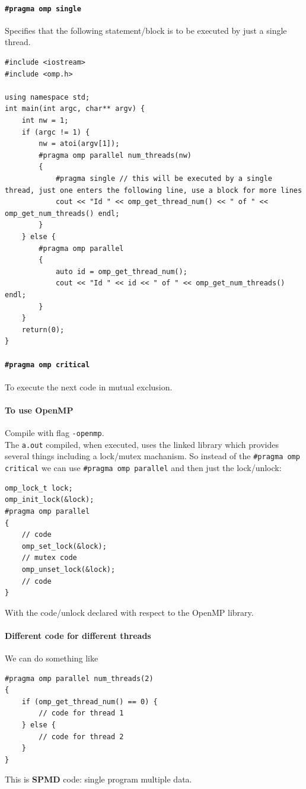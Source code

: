 \documentclass[10pt]{report}
\begin{document}
\paragraph{\texttt{\#pragma omp single}} Specifies that the following statement/block is to be executed by just a single thread.
\begin{lstlisting}[style=myC]
#include <iostream>
#include <omp.h>

using namespace std;
int main(int argc, char** argv) {
	int nw = 1;
	if (argc != 1) {
		nw = atoi(argv[1]);
		#pragma omp parallel num_threads(nw)
		{
			#pragma single // this will be executed by a single thread, just one enters the following line, use a block for more lines
			cout << "Id " << omp_get_thread_num() << " of " << omp_get_num_threads() endl;
		}
	} else {
		#pragma omp parallel
		{
			auto id = omp_get_thread_num();
			cout << "Id " << id << " of " << omp_get_num_threads() endl;
		}
	}
	return(0);
}
\end{lstlisting}
\paragraph{\texttt{\#pragma omp critical}} To execute the next code in mutual exclusion.
\paragraph{To use OpenMP} Compile with flag \texttt{-openmp}.\\
The \texttt{a.out} compiled, when executed, uses the linked library which provides several things including a lock/mutex machanism. So instead of the \texttt{\#pragma omp critical} we can use \texttt{\#pragma omp parallel} and then just the lock/unlock:
\begin{lstlisting}[style=myC]
omp_lock_t lock;
omp_init_lock(&lock);
#pragma omp parallel
{
	// code
	omp_set_lock(&lock);
	// mutex code
	omp_unset_lock(&lock);
	// code
}
\end{lstlisting}
With the code/unlock declared with respect to the OpenMP library.
\paragraph{Different code for different threads} We can do something like
\begin{lstlisting}[style=myC]
#pragma omp parallel num_threads(2)
{
	if (omp_get_thread_num() == 0) {
		// code for thread 1
	} else {
		// code for thread 2
	}
}
\end{lstlisting}
This is \textbf{SPMD} code: single program multiple data.
\end{document}
